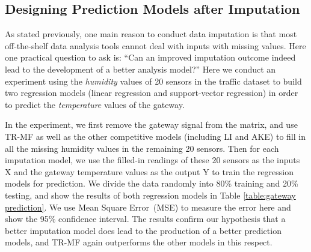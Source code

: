 

\subsection{Designing Prediction Models after Imputation}\label{subsec:furtherPredict}
As stated previously, one main reason to conduct data imputation is that most off-the-shelf data analysis tools cannot deal with inputs with missing values.
Here one practical question to ask is: ``Can an improved imputation outcome indeed lead to the development of a better analysis model?''
Here we conduct an experiment using the {\em humidity} values of 20 sensors in the traffic dataset to build two regression models (linear regression and support-vector regression) in order
to predict the {\em temperature} values of the gateway.

In the experiment, we first remove the gateway signal from the matrix, and use TR-MF as well as the other competitive models (including LI and AKE) to fill in all the missing humidity values in the remaining 20 sensors.
Then for each imputation model, we use the filled-in readings of these 20 sensors as the inputs X and the gateway temperature values as the output Y to train the regression models for prediction.
We divide the data randomly into 80\% training and 20\% testing, and show the results of both regression models in Table \ref{table:gateway prediction}.
We use Mean Square Error~(MSE) to measure the error here and show the 95\% confidence interval.
The results confirm our hypothesis that a better imputation model does lead to the production of a better prediction models, and TR-MF again outperforms the other models in this respect.

